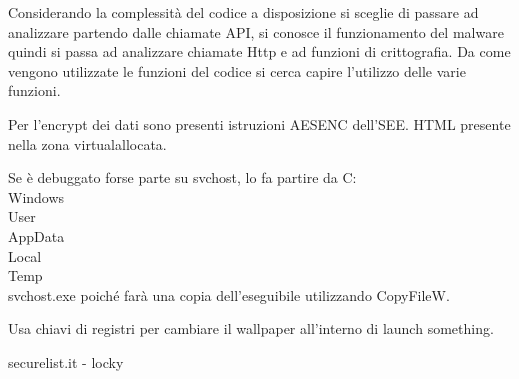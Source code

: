 \documentclass[]{article}
\begin{document}
Considerando la complessità del codice a disposizione si sceglie di passare ad analizzare partendo dalle chiamate API, si conosce il funzionamento del malware quindi si passa ad analizzare chiamate Http e ad funzioni di crittografia. Da come vengono utilizzate le funzioni del codice si cerca capire l'utilizzo delle varie funzioni. 

Per l'encrypt dei dati sono presenti istruzioni AESENC dell'SEE. HTML presente nella zona virtualallocata.

Se è debuggato forse parte su svchost, lo fa partire da C:\\Windows\\User\\AppData\\Local\\Temp\\svchost.exe poiché farà una copia dell'eseguibile utilizzando CopyFileW.

Usa chiavi di registri per cambiare il wallpaper all'interno di launch something. 

securelist.it - locky
\end{document}
